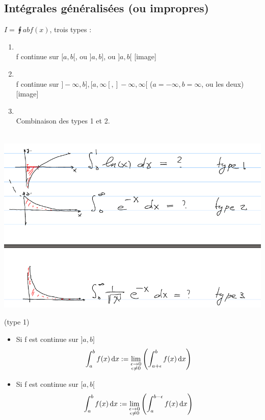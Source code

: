 \documentclass[12pt,a4paper]{article}
\begin{document}
{\subsection{Intégrales généralisées (ou impropres)}
$I = \intx{a}{b}{f(x)}$, trois types :
\begin{enumerate}
	\item {}\\
		f continue sur $[a,b[$, ou $]a,b]$, ou $]a,b[$
		[image]
	\item {}\\
	f continue sur $]-\infty,b], [a, \infty[, ]-\infty,\infty[$ ($a = -\infty, b = \infty$, ou les deux)
	[image]
	\item {}\\
	Combinaison des types 1 et 2.
\end{enumerate}
\\
\includegraphics[scale=0.5]{Illustrations_Analyse/ex_explicites2}\\
\begin{boite}
	\Definition (type 1)\\
	\begin{itemize}
		\item Si f est continue sur $]a,b]$
		\begin{equation}
			\int_{a}^{b} f(x) \, \mathrm d x := \lim\limits_{\substack{\epsilon \to 0 \\ \epsilon  \neq 0}}\left(\int_{a+\epsilon}^{b} f(x) \, \mathrm d x\right)
		\end{equation}
		\item Si f est continue sur $[a,b[$
		\begin{equation}
			\int_{a}^{b} f(x) \, \mathrm d x := \lim\limits_{\substack{\epsilon \to 0 \\ \epsilon  \neq 0}}\left(\int_{a}^{b-\epsilon} f(x) \, \mathrm d x\right)
		\end{equation}

\end{itemize}
\end{boite}}
\end{document}

